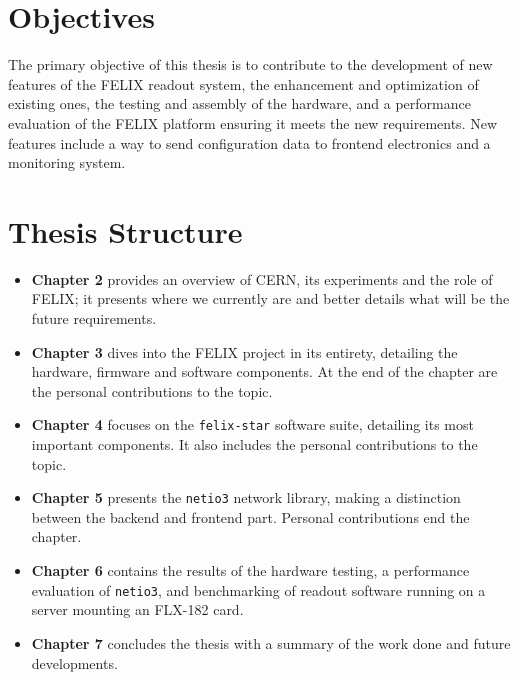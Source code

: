 \section{Objectives}

The primary objective of this thesis is to contribute to the development of new features of the \acs{FELIX} readout system, the enhancement and optimization of existing ones, the testing and assembly of the hardware, and a performance evaluation of the \acs{FELIX} platform ensuring it meets the new requirements.
New features include a way to send configuration data to frontend electronics and a monitoring system.

\section{Thesis Structure}

\begin{itemize}
    \item \textbf{Chapter 2} provides an overview of \acs{CERN}, its experiments and the role of \acs{FELIX}; it presents where we currently are and better details what will be the future requirements.
    
    \item \textbf{Chapter 3} dives into the \acs{FELIX} project in its entirety, detailing the hardware, firmware and software components. At the end of the chapter are the personal contributions to the topic.
    
    \item \textbf{Chapter 4} focuses on the \texttt{felix-star} software suite, detailing its most important components. It also includes the personal contributions to the topic.
    
    \item \textbf{Chapter 5} presents the \texttt{netio3} network library, making a distinction between the backend and frontend part. Personal contributions end the chapter.
    
    \item \textbf{Chapter 6} contains the results of the hardware testing, a performance evaluation of \texttt{netio3}, and benchmarking of readout software running on a server mounting an FLX-182 card.
    
    \item \textbf{Chapter 7} concludes the thesis with a summary of the work done and future developments.
\end{itemize}